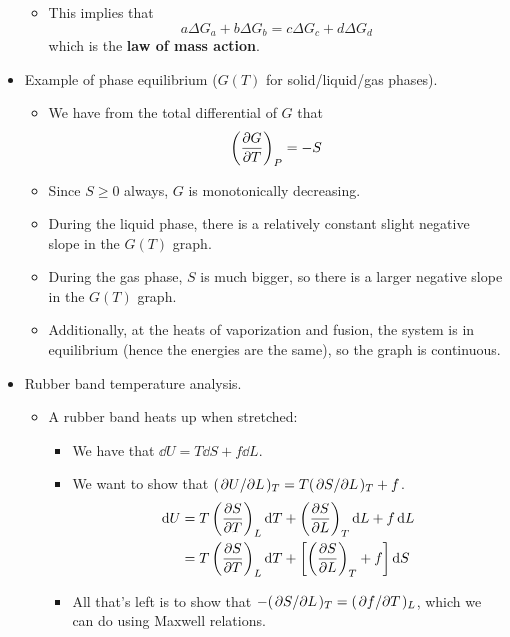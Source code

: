\documentclass[../notes.tex]{subfiles}
\begin{document}
\begin{itemize}
\begin{itemize}
        \item This implies that
        \begin{equation*}
            a\Delta G_a+b\Delta G_b = c\Delta G_c+d\Delta G_d
        \end{equation*}
        which is the \textbf{law of mass action}.
    \end{itemize}
    \item Example of phase equilibrium ($G(T)$ for solid/liquid/gas phases).
    \begin{itemize}
        \item We have from the total differential of $G$ that
        \begin{equation*}
            \left( \pdv{G}{T} \right)_P = -S
        \end{equation*}
        \item Since $S\geq 0$ always, $G$ is monotonically decreasing.
        \item During the liquid phase, there is a relatively constant slight negative slope in the $G(T)$ graph.
        \item During the gas phase, $S$ is much bigger, so there is a larger negative slope in the $G(T)$ graph.
        \item Additionally, at the heats of vaporization and fusion, the system is in equilibrium (hence the energies are the same), so the graph is continuous.
    \end{itemize}
    \item Rubber band temperature analysis.
    \begin{itemize}
        \item A rubber band heats up when stretched:
        \begin{itemize}
            \item We have that $\dd{U}=T\dd{S}+f\dd{L}$.
            \item We want to show that $(\pdv*{U}{L})_T=T(\pdv*{S}{L})_T+f$.
            \begin{align*}
                \dd{U} &= T\left( \pdv{S}{T} \right)_L\dd{T}+\left( \pdv{S}{L} \right)_T\dd{L}+f\dd{L}\\
                &= T\left( \pdv{S}{T} \right)_L\dd{T}+\left[ \left( \pdv{S}{L} \right)_T+f \right]\dd{S}
            \end{align*}
            \item All that's left is to show that $-(\pdv*{S}{L})_T=(\pdv*{f}{T})_L$, which we can do using Maxwell relations.
            \begin{equation*}

\end{equation*}
\end{itemize}
\end{itemize}
\end{itemize}
\end{document}
